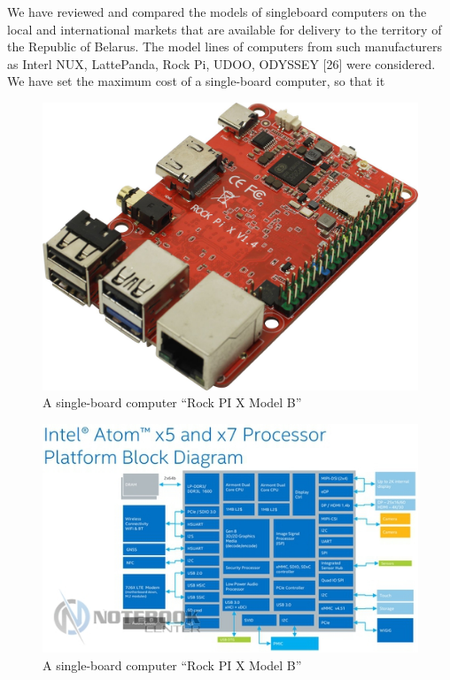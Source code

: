 \documentclass[10pt,twocolumn]{article}
\begin{document}
We have reviewed and compared the models of singleboard computers on the local and international markets
that are available for delivery to the territory of the
Republic of Belarus. The model lines of computers from
such manufacturers as Interl NUX, LattePanda, Rock Pi,
UDOO, ODYSSEY [26] were considered. We have set
the maximum cost of a single-board computer, so that it\\

\begin{figure}[h]
  \setcounter{figure}{12}
  \includegraphics[width=\linewidth]{raspberry.jpg}
  \caption{A single-board computer “Rock PI X Model B”}
\end{figure}

\begin{figure}[h]
  \includegraphics[width=\linewidth]{diagram.jpg}
  \caption{A single-board computer “Rock PI X Model B”}
\end{figure}
\end{document}
